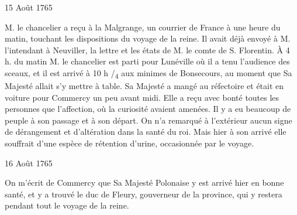                      \begin{diary}{15 Août 1765}{}
                        
                        
                           M. le chancelier a reçu à
                              la Malgrange,
                           un courrier de France à une heure du matin,
                           touchant les dispositions du voyage de la
                              reine. Il avait déjà envoyé à M. l'intendant
                           à Neuviller, la lettre et
                           les états de M. le
                              comte de S. Florentin. À 4 h. du matin
                           M. le chancelier est parti
                           pour Lunéville
                           où il a tenu l'audience des sceaux, et il
                           est arrivé à 10 h /\textsubscript{4} aux
                              minimes de
                              Bonsecours,
                           au moment que Sa Majesté allait
                           s'y mettre à table. Sa Majesté a mangé au
                           réfectoire et était en voiture pour Commercy
                           un peu avant midi. Elle a reçu avec
                           bonté toutes les personnes que l'affection,
                           où la curiosité avaient amenées. Il y a
                           eu beaucoup de peuple à son passage et à
                           son départ. On n'a remarqué à l'extérieur
                           aucun signe de dérangement et d'altération
                           dans la santé du roi. Mais
                           hier à
                           son arrivé elle souffrait d'une espèce
                           de rétention d'urine, occasionnée par le
                           voyage. \bigskip
        
        
                     \end{diary}

                     \begin{diary}{16 Août 1765}{}
                        
                         On m'écrit de Commercy que Sa Majesté Polonaise
                           y est arrivé hier en bonne santé, et
                           y a trouvé le duc de Fleury,
                           gouverneur
                           de la province, qui y restera pendant tout le voyage de la reine. \bigskip
        
        
                     \end{diary}

